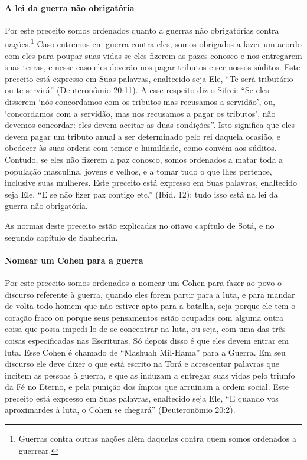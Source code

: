\paragraph{A lei da guerra não obrigatória}

Por este preceito somos ordenados quanto a guerras não obrigatórias contra nações.\footnote{Guerras contra outras nações além daquelas contra quem somos
  ordenados a guerrear.} Caso entremos em guerra contra eles, somos obrigados
a fazer um acordo com eles para poupar suas vidas se eles fizerem as
pazes conosco e nos entregarem suas terras, e nesse caso eles deverão nos pagar
tributos e ser nossos súditos. Este preceito está expresso em Suas
palavras, enaltecido seja Ele, ``Te será tributário ou te servirá''
(Deuteronômio 20:11). A esse respeito diz o Sifrei: ``Se eles disserem
`nós concordamos com os tributos mas recusamos a servidão', ou,
`concordamos com a servidão, mas nos recusamos a pagar os tributos', não
devemos concordar: eles devem aceitar as duas condições''. Isto
significa que eles devem pagar um tributo anual a ser determinado pelo
rei daquela ocasião, e obedecer às suas ordens com temor e humildade,
como convém aos súditos. Contudo, se eles não fizerem a paz conosco,
somos ordenados a matar toda a população masculina, jovens e velhos, e a
tomar tudo o que lhes pertence, inclusive suas mulheres. Este preceito
está expresso em Suas palavras, enaltecido seja Ele, ``E se não fizer
paz contigo etc.'' (Ibid. 12); tudo isso está na lei da guerra não
obrigatória.

As normas deste preceito estão explicadas no oitavo capítulo de Sotá, e
no segundo capítulo de Sanhedrin.

\paragraph{Nomear um Cohen para a guerra}

Por este preceito somos ordenados a nomear um Cohen para fazer ao
povo o discurso referente à guerra, quando eles forem partir para a
luta, e para mandar de volta todo homem que não estiver apto para a batalha,
seja porque ele tem o coração fraco ou porque seus pensamentos estão
ocupados com alguma outra coisa que possa impedi-lo de se concentrar na
luta, ou seja, com uma das três coisas especificadas nas Escrituras. Só
depois disso é que eles devem entrar em luta. Esse Cohen é chamado
de ``Mashuah Mil-Hama'' para a Guerra. Em seu discurso ele deve dizer o
que está escrito na Torá e acrescentar palavras que incitem as pessoas
à guerra, e que as induzam a entregar suas vidas pelo triunfo da Fé no
Eterno, e pela punição dos ímpios que arruinam a ordem social. Este
preceito está expresso em Suas palavras, enaltecido seja Ele, ``E quando
vos aproximardes à luta, o Cohen se chegará'' (Deuteronômio 20:2).

